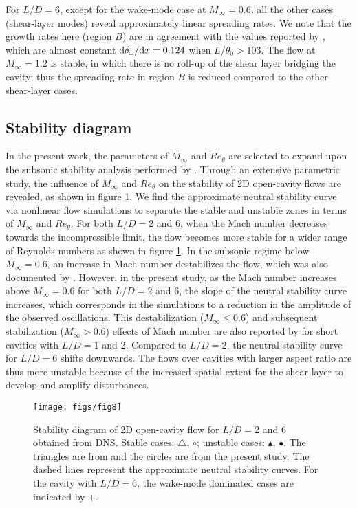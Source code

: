 \documentclass{jfm}
\begin{document}
For $L/D=6$, except for the wake-mode case at $M_\infty=0.6$, all the other cases (shear-layer modes) reveal approximately linear spreading rates. We note that the growth rates here (region $B$) are in agreement with the values reported by \cite{Gharib:JFM87}, which are almost constant ${\rm d} \delta_\omega/{\rm d} x=0.124$ when $L/\theta_0 > 103$. The flow at $M_\infty=1.2$ is stable, in which there is no roll-up of the shear layer bridging the cavity; thus the spreading rate in region $B$ is reduced compared to the other shear-layer cases. 

\subsection{Stability diagram} 

In the present work, the parameters of $M_\infty$ and $Re_\theta$ are selected to expand upon the subsonic stability analysis performed by \cite{Bres:JFM08}. Through an extensive parametric study, the influence of $M_\infty$ and $Re_\theta$ on the stability of 2D open-cavity flows are revealed, as shown in figure \ref{fig:map}. We find the approximate neutral stability curve via nonlinear flow simulations to separate the stable and unstable zones in terms of $M_\infty$ and $Re_\theta$. For both $L/D=2$ and 6, when the Mach number decreases towards the incompressible limit, the flow becomes more stable for a wider range of Reynolds numbers as shown in figure \ref{fig:map}. In the subsonic regime below $M_\infty=0.6$, an increase in Mach number destabilizes the flow, which was also documented by \cite{Bres:JFM08}. However, in the present study, as the Mach number increases above $M_\infty=0.6$ for both $L/D=2$ and 6, the slope of the neutral stability curve increases, which corresponds in the simulations to a reduction in the amplitude of the observed oscillations. This destabilization ($M_\infty\le0.6$) and subsequent stabilization ($M_\infty>0.6$) effects of Mach number are also reported by \cite{Yamouni:JFM13} for short cavities with $L/D=1$ and 2. Compared to $L/D=2$, the neutral stability curve for $L/D=6$ shifts downwards. The flows over cavities with larger aspect ratio are thus more unstable because of the increased spatial extent for the shear layer to develop and amplify disturbances.

\begin{figure}
\centering
   \texttt{[image: figs/fig8]}
   \caption{Stability diagram of 2D open-cavity flow for $L/D = 2$ and 6 obtained from DNS. Stable cases: {\scriptsize $\triangle$}, {\large $\circ$}; unstable cases: {\footnotesize $\blacktriangle$}, {\large $\bullet$}. The triangles are from \cite{Bres:JFM08} and the circles are from the present study. The dashed lines represent the approximate neutral stability curves. For the cavity with $L/D=6$, the wake-mode dominated cases are indicated by $+$.}
   \label{fig:map} 
\end{figure}
\end{document}
